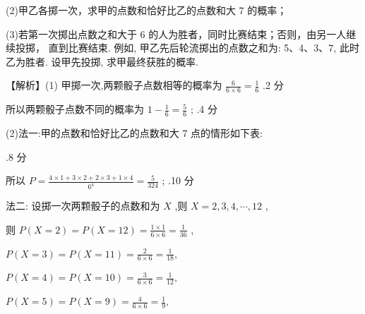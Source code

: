 \documentclass[10pt]{article}
\begin{document}
(2)甲乙各掷一次，求甲的点数和恰好比乙的点数和大 7 的概率；

(3)若第一次掷出点数之和大于 6 的人为胜者，同时比赛结束；否则，由另一人继续投掷， 直到比赛结束. 例如, 甲乙先后轮流掷出的点数之和为: 5、4、3、7, 此时乙为胜者. 设甲先投掷, 求甲最终获胜的概率.

【解析】(1) 甲掷一次,两颗骰子点数相等的概率为 \(\frac{6}{6 \times  6} = \frac{1}{6}\) .2 分

所以两颗骰子点数不同的概率为 \(1 - \frac{1}{6} = \frac{5}{6}\) ; .4 分

(2)法一:甲的点数和恰好比乙的点数和大 7 点的情形如下表:

\begin{center}
\end{center}

.8 分

所以 \(P = \frac{4 \times  1 + 3 \times  2 + 2 \times  3 + 1 \times  4}{{6}^{4}} = \frac{5}{324}\) ; .10 分

法二: 设掷一次两颗骰子的点数和为 \(X\) ,则 \(X = 2,3,4,\cdots ,{12}\) ,

则 \(P\left( {X = 2}\right)  = P\left( {X = {12}}\right)  = \frac{1 \times  1}{6 \times  6} = \frac{1}{36}\) ,

\(P\left( {X = 3}\right)  = P\left( {X = {11}}\right)  = \frac{2}{6 \times  6} = \frac{1}{18},\)

\(P\left( {X = 4}\right)  = P\left( {X = {10}}\right)  = \frac{3}{6 \times  6} = \frac{1}{12},\)

\(P\left( {X = 5}\right)  = P\left( {X = 9}\right)  = \frac{4}{6 \times  6} = \frac{1}{9},\)
\end{document}

